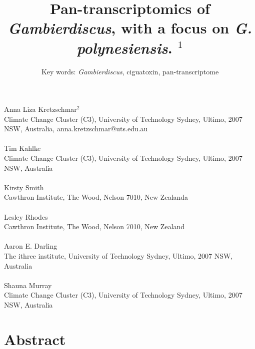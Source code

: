\documentclass[12pt]{article}
\title{Pan-transcriptomics of \emph{Gambierdiscus}, with a focus on \emph{G. polynesiensis}. $^{1}$}
\author{Key words: \emph{Gambierdiscus}, ciguatoxin, pan-transcriptome}
\date{}
\begin{document}
\maketitle
\paragraph{}Anna Liza Kretzschmar$^{2}$\\
Climate Change Cluster (C3), University of Technology Sydney, Ultimo, 2007 NSW, Australia, anna.kretzschmar@uts.edu.au
\paragraph{}Tim Kahlke\\
Climate Change Cluster (C3), University of Technology Sydney, Ultimo, 2007 NSW, Australia
\paragraph{}Kirsty Smith \\
Cawthron Institute, The Wood, Nelson 7010, New Zealanda
\paragraph{}Lesley Rhodes \\
Cawthron Institute, The Wood, Nelson 7010, New Zealand
\paragraph{}Aaron E. Darling \\
The ithree institute, University of Technology Sydney, Ultimo, 2007 NSW, Australia
\paragraph{}Shauna Murray\\ 
Climate Change Cluster (C3), University of Technology Sydney, Ultimo, 2007 NSW, Australia
\newpage
\section*{Abstract}
\end{document}
